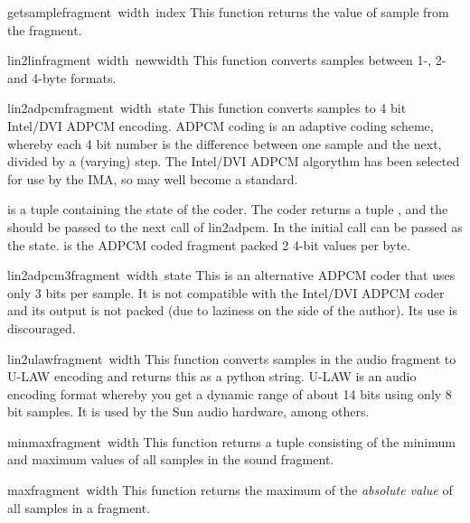 \begin{funcdesc}{getsample}{fragment\, width\, index}
This function returns the value of sample  from the
fragment.
\end{funcdesc}

\begin{funcdesc}{lin2lin}{fragment\, width\, newwidth}
This function converts samples between 1-, 2- and 4-byte formats.
\end{funcdesc}

\begin{funcdesc}{lin2adpcm}{fragment\, width\, state}
This function converts samples to 4 bit Intel/DVI ADPCM encoding.
ADPCM coding is an adaptive coding scheme, whereby each 4 bit number
is the difference between one sample and the next, divided by a
(varying) step. The Intel/DVI ADPCM algorythm has been selected for
use by the IMA, so may well become a standard.

 is a tuple containing the state of the coder. The coder
returns a tuple , and the
 should be passed to the next call of lin2adpcm.  In the
initial call  can be passed as the state.  is
the ADPCM coded fragment packed 2 4-bit values per byte.
\end{funcdesc}

\begin{funcdesc}{lin2adpcm3}{fragment\, width\, state}
This is an alternative ADPCM coder that uses only 3 bits per sample.
It is not compatible with the Intel/DVI ADPCM coder and its output is
not packed (due to laziness on the side of the author). Its use is
discouraged.
\end{funcdesc}

\begin{funcdesc}{lin2ulaw}{fragment\, width}
This function converts samples in the audio fragment to U-LAW encoding
and returns this as a python string. U-LAW is an audio encoding format
whereby you get a dynamic range of about 14 bits using only 8 bit
samples. It is used by the Sun audio hardware, among others.
\end{funcdesc}

\begin{funcdesc}{minmax}{fragment\, width}
This function returns a tuple consisting of the minimum and maximum
values of all samples in the sound fragment.
\end{funcdesc}

\begin{funcdesc}{max}{fragment\, width}
This function returns the maximum of the {\em absolute value} of all
samples in a fragment.
\end{funcdesc}

